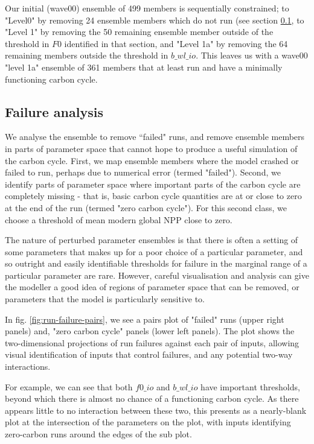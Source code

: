 \documentclass[gmd, manuscript]{copernicus}
\begin{document}
Our initial (wave00) ensemble of 499 members is sequentially constrained; to "Level0" by removing 24 ensemble members which do not run (see section \ref{ssec:failure-analysis}, to "Level 1" by removing the 50 remaining ensemble member outside of the threshold in $F0$ identified in that section, and "Level 1a" by removing the 64 remaining members outside the threshold in $b\_wl\_io$. This leaves us with a wave00 "level 1a" ensemble of 361 members that at least run and have a minimally functioning carbon cycle.

\subsection{Failure analysis}\label{ssec:failure-analysis}

We analyse the ensemble to remove ``failed" runs, and remove ensemble members in parts of parameter space that cannot hope to produce a useful simulation of the carbon cycle. First, we map ensemble members where the model crashed or failed to run, perhaps due to numerical error (termed "failed"). Second, we identify parts of parameter space where important parts of the carbon cycle are completely missing - that is, basic carbon cycle quantities are at or close to zero at the end of the run (termed "zero carbon cycle"). For this second class, we choose a threshold of mean modern global NPP close to zero.

The nature of perturbed parameter ensembles is that there is often a setting of some parameters that makes up for a poor choice of a particular parameter, and so outright and easily identifiable thresholds for failure in the marginal range of a particular parameter are rare. However, careful visualisation and analysis can give the modeller a good idea of regions of parameter space that can be removed, or parameters that the model is particularly sensitive to.

In fig. \ref{fig:run-failure-pairs}, we see a pairs plot of "failed" runs (upper right panels) and, "zero carbon cycle" panels (lower left panels). The plot shows the two-dimensional projections of run failures against each pair of inputs, allowing visual identification of inputs that control failures, and any potential two-way interactions.

For example, we can see that both $f0\_io$ and $b\_wl\_io$ have important thresholds, beyond which there is almost no chance of a functioning carbon cycle. As there appears little to no interaction between these two, this presents as a nearly-blank plot at the intersection of the parameters on the plot, with inputs identifying zero-carbon runs around the edges of the sub plot.
\end{document}
